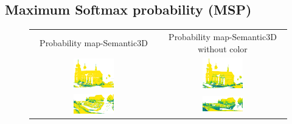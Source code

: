     \subsection{Maximum Softmax probability (MSP)}
    \begin{figure}[h!]
        \centering
        \begin{tabular}{cc}
            Probability map-Semantic3D & Probability map-Semantic3D without color \\
            \includegraphics[width=0.33\textwidth, height=0.18\textheight]{images/ood_imgs/de_sem3d/de_prob_10_1.png}&
            \includegraphics[width=0.33\textwidth, height=0.18\textheight]{images/sem3d_of/de_prob_sem3d_of_1.png}\\

            \includegraphics[width=0.33\textwidth, height=0.18\textheight]{images/ood_imgs/de_sem3d/de_prob_10_2.png}&
            \includegraphics[width=0.33\textwidth, height=0.18\textheight]{images/sem3d_of/de_prob_sem3d_of_2.png}\\


\end{tabular}
\end{figure}
